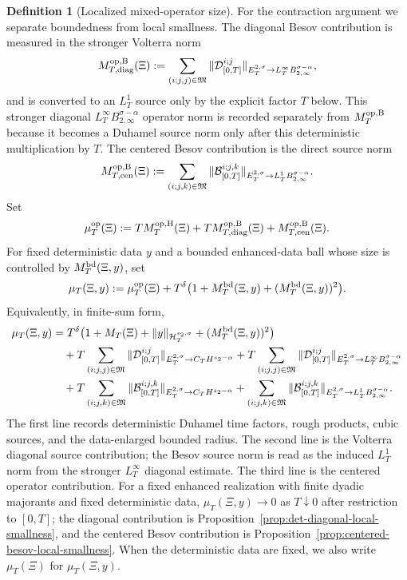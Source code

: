 \documentclass[10pt]{amsart}
\numberwithin{equation}{section}
\theoremstyle{plain}
\theoremstyle{definition}
\newtheorem{definition}[theorem]{Definition}
\theoremstyle{remark}
\newcommand{\Btwo}{B_{2,\infty}}
\begin{document}
\begin{definition}[Localized mixed-operator size]\label{def:localized-mixed-size}
For the contraction argument we separate boundedness from local smallness.  The diagonal Besov contribution is measured in the stronger Volterra norm
\[
M_{T,\mathrm{diag}}^{\rm op,B}(\Xi):=
\sum_{(i;j,j)\in\mathfrak M}\|\mathcal D^{i;j}_{[0,T]}\|_{E_T^{2,\sigma}\to L_T^\infty\Btwo^{\sigma-\alpha}},
\]
and is converted to an $L_T^1$ source only by the explicit factor $T$ below.  This stronger diagonal $L_T^\infty B_{2,\infty}^{\sigma-\alpha}$ operator norm is recorded separately from $M_T^{\rm op,B}$ because it becomes a Duhamel source norm only after this deterministic multiplication by $T$.  The centered Besov contribution is the direct source norm
\[
M_{T,\mathrm{cen}}^{\rm op,B}(\Xi):=
\sum_{(i;j,k)\in\mathfrak M}\|\mathcal B^{i;j,k}_{[0,T]}\|_{E_T^{2,\sigma}\to L_T^1\Btwo^{\sigma-\alpha}}.
\]
Set
\begin{equation}\label{eq:localized-mixed-size}
\mu_T^{\rm op}(\Xi):=T M_T^{\rm op,H}(\Xi)+T M_{T,\mathrm{diag}}^{\rm op,B}(\Xi)+M_{T,\mathrm{cen}}^{\rm op,B}(\Xi).
\end{equation}
For fixed deterministic data $y$ and a bounded enhanced-data ball whose size is controlled by $M_T^{\rm bd}(\Xi,y)$, set
\begin{equation}\label{eq:localized-full-size}
\mu_T(\Xi,y):=\mu_T^{\rm op}(\Xi)+T^\delta\bigl(1+M_T^{\rm bd}(\Xi,y)+(M_T^{\rm bd}(\Xi,y))^2\bigr).
\end{equation}
Equivalently, in finite-sum form,
\begin{align}\label{eq:muT-explicit}
\mu_T(\Xi,y)&=T^\delta\bigl(1+M_T(\Xi)+\|y\|_{\mathcal H_T^{s_2,\sigma}}+(M_T^{\rm bd}(\Xi,y))^2\bigr)\nonumber\\
&\quad+T\sum_{(i;j,j)\in\mathfrak M}\|\mathcal D^{i;j}_{[0,T]}\|_{E_T^{2,\sigma}\to C_TH^{s_2-\alpha}}
+T\sum_{(i;j,j)\in\mathfrak M}\|\mathcal D^{i;j}_{[0,T]}\|_{E_T^{2,\sigma}\to L_T^\infty B_{2,\infty}^{\sigma-\alpha}}\nonumber\\
&\quad+T\sum_{(i;j,k)\in\mathfrak M}\|\mathcal B^{i;j,k}_{[0,T]}\|_{E_T^{2,\sigma}\to C_TH^{s_2-\alpha}}
+\sum_{(i;j,k)\in\mathfrak M}\|\mathcal B^{i;j,k}_{[0,T]}\|_{E_T^{2,\sigma}\to L_T^1B_{2,\infty}^{\sigma-\alpha}}.
\end{align}
The first line records deterministic Duhamel time factors, rough products, cubic sources, and the data-enlarged bounded radius.  The second line is the Volterra diagonal source contribution; the Besov source norm is read as the induced $L_T^1$ norm from the stronger $L_T^\infty$ diagonal estimate.  The third line is the centered operator contribution.  For a fixed enhanced realization with finite dyadic majorants and fixed deterministic data, $\mu_T(\Xi,y)\to0$ as $T\downarrow0$ after restriction to $[0,T]$; the diagonal contribution is Proposition~\ref{prop:det-diagonal-local-smallness}, and the centered Besov contribution is Proposition~\ref{prop:centered-besov-local-smallness}.  When the deterministic data are fixed, we also write $\mu_T(\Xi)$ for $\mu_T(\Xi,y)$.


\end{definition}
\end{document}
